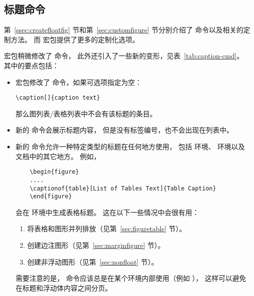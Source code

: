 \subsection{标题命令} \label{ssec:caption-cmd}

第~\ref{ssec:createfloatfig} 节和第~\ref{sec:customfigure} 节分别介绍了  命令以及相关的定制方法。
而  宏包提供了更多的定制化选项。

 宏包稍微修改了  命令，
此外还引入了一些新的变形，见表~\ref{tab:caption-cmd}。
其中的要点包括：
\begin{itemize}
	\item {} 宏包修改了  命令，如果可选项指定为空：
\begin{lstlisting}
\caption[]{caption text}
\end{lstlisting}
	那么图列表/表格列表中不会有该标题的条目。
	
	\item 新的  命令会展示标题内容，
	但是没有标签编号，也不会出现在列表中。
	
	\item 新的  命令允许一种特定类型的标题在任何地方使用，
	包括  环境、 环境以及文档中的其它地方。
	例如，
	\begin{lstlisting}
	\begin{figure}
	....
	\captionof{table}[List of Tables Text]{Table Caption}
	\end{figure}
	\end{lstlisting}
	会在  环境中生成表格标题。
	这在以下一些情况中会很有用：
	\begin{enumerate}
		\item 将表格和图形并列排放（见第~\ref{sec:figuretable} 节）。
		\item 创建边注图形（见第~\ref{sec:marginfigure} 节）。
		\item 创建非浮动图形（见第~\ref{sec:nonfloat} 节）。
	\end{enumerate}
	需要注意的是， 命令应该总是在某个环境内部使用（例如 ），
	这样可以避免在标题和浮动体内容之间分页。
\end{itemize}

